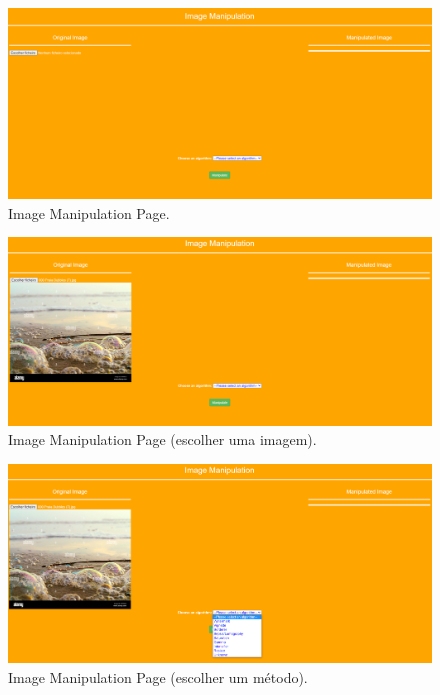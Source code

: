 \documentclass{report}
\begin{document}
      \begin{figure}[!hbtp]
        \centering 
        \includegraphics[scale=0.29]{Images_code/0 - image manipulation.png}
        \caption{\label{Image Manipulation}Image Manipulation Page.}
    \end{figure}

    \begin{figure}[!hbtp]
        \centering 
        \includegraphics[scale=0.29]{Images_code/0 - image manipulation 2.png}
        \caption{\label{Image Manipulation}Image Manipulation Page (escolher uma imagem).}
    \end{figure}

    \begin{figure}[!hbtp]
        \centering 
        \includegraphics[scale=0.29]{Images_code/0 - image manipulation 3.png}
        \caption{\label{Image Manipulation}Image Manipulation Page (escolher um método).}
    \end{figure}
\end{document}
